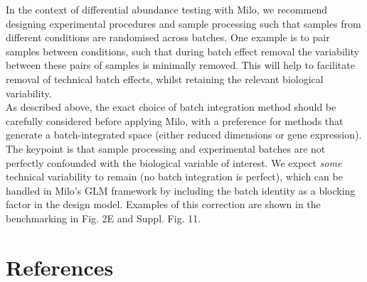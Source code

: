 \documentclass[
]{article}
\begin{document}
In the context of differential abundance testing with Milo, we recommend designing experimental procedures and sample processing such that samples from different
conditions are randomised across batches. One example is to pair samples between conditions, such that during batch effect removal the variability between these
pairs of samples is minimally removed. This will help to facilitate removal of technical batch effects, whilst retaining the relevant biological variability.\\
As described above, the exact choice of batch integration method should be carefully considered before applying Milo, with a preference for methods that generate
a batch-integrated space (either reduced dimensions or gene expression). The keypoint is that sample processing and experimental batches are not perfectly
confounded with the biological variable of interest. We expect \emph{some} technical variability to remain (no batch integration is perfect), which can be handled in
Milo's GLM framework by including the batch identity as a blocking factor in the design model. Examples of this correction are shown in the benchmarking in
Fig. 2E and Suppl. Fig. 11.

\hypertarget{references}{%
\section*{References}\label{references}}
\end{document}
